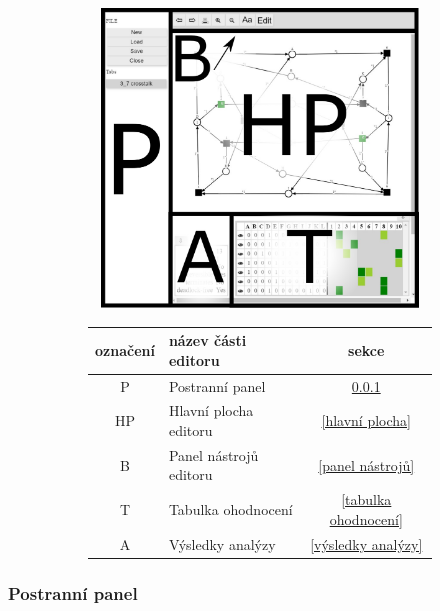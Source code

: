 \documentclass[
  biblatex,
  glossaries,
  index
]{kidiplom}
\begin{document}
\begin{figure}[h]
  \centering
  \begin{subfigure}[h]{350px}
    \includegraphics[height=300px, width=350px]{full_image_splited}
  \end{subfigure}
  \caption{Rozložení editoru}
  \label{fig:Rozložení editoru}
  \begin{subfigure}[h]{0.55\textwidth}
    \begin{tabular}{|c l c|}
      \hline
      označení &      název části editoru &    sekce \\
      \hline
      \hline
      P &             Postranní panel&  \ref{panel} \\
      HP &            Hlavní plocha editoru&  \ref{hlavní plocha} \\
      B &             Panel nástrojů editoru &  \ref{panel nástrojů} \\
      T &             Tabulka ohodnocení &  \ref{tabulka ohodnocení} \\
      A &             Výsledky analýzy &  \ref{výsledky analýzy} \\
      \hline
    \end{tabular}
  \end{subfigure}
\end{figure}


\subsubsection{Postranní panel}\label{panel}
\end{document}
